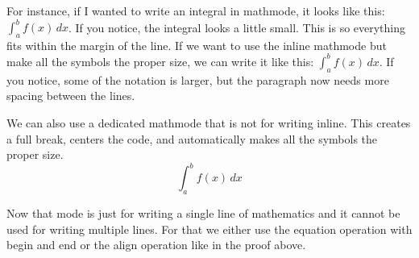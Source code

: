 \documentclass[12pt]{article}
\begin{document}
For instance, if I wanted to write an integral in mathmode, it looks like this: $\int_a^b f(x) \, dx$.  If you notice, the integral looks a little small.  This is so everything fits within the margin of the line.  If we want to use the inline mathmode but make all the symbols the proper size, we can write it like this: $\displaystyle \int_a^b f(x) \, dx$.  If you notice, some of the notation is larger, but the paragraph now needs more spacing between the lines.

We can also use a dedicated mathmode that is not for writing inline.  This creates a full break, centers the code, and automatically makes all the symbols the proper size.
\[ \int_a^b f(x) \, dx \]

Now that mode is just for writing a single line of mathematics and it cannot be used for writing multiple lines.  For that we either use the equation operation with begin and end or the align operation like in the proof above.
\end{document}
